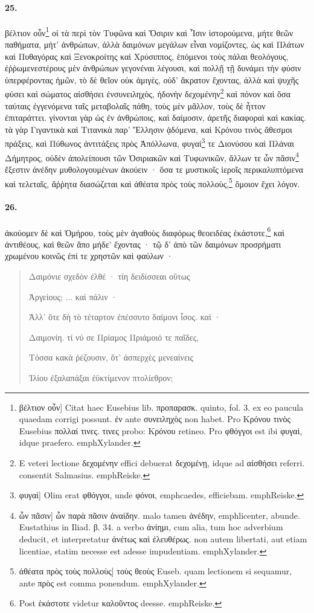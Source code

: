 \documentclass[a4paper, 11pt, oneside, polutonikogreek, german]{article}
\begin{document}
\paragraph{25.}
βέλτιον οὖν\footnote{βέλτιον οὖν] Citat haec Eusebius lib. προπαρασκ. quinto, fol. 3. ex eo paucula quaedam corrigi possunt. ἐν ante συνειληχὸς non habet. Pro Κρόνου τινὸς Eusebius πολλαί τινες. τινες probo: Κρόνου retineo. Pro φθόγγοι est ibi φυγαὶ, idque praefero. emph{Xylander.}} οἱ τὰ περὶ τὸν Τυφῶνα καὶ Ὄσιριν καὶ Ἶσιν ἱστορούμενα, μήτε θεῶν παθήματα, μήτ' ἀνθρώπων, ἀλλὰ δαιμόνων μεγάλων εἶναι νομίζοντες, ὡς καὶ Πλάτων καὶ Πυθαγόρας καὶ Ξενοκροίτης καὶ Χρύσιππος, ἑπόμενοι τοὺς πάλαι θεολόγους, ἐῤῥωμενεστέρους μὲν ἀνθρώπων γεγονέναι λέγουσι, καὶ πολλῇ τῇ δυνάμει τὴν φύσιν ὑπερφέροντας ἡμῶν, τὸ δὲ θεῖον οὐκ ἀμιγὲς, οὐδ' ἄκρατον ἔχοντας, ἀλλὰ καὶ ψυχῆς φύσει καὶ σώματος αἰσθήσει ἐνσυνειληχὸς, ἡδονὴν δεχομένην\footnote{E veteri lectione δεχομένην effici debuerat δεχομένῃ, idque ad αἰσθήσει referri. consentit Salmasius. emph{Reiske.}} καὶ πόνον καὶ ὅσα ταύταις ἐγγενόμενα ταῖς μεταβολαῖς πάθη, τοὺς μὲν μᾶλλον, τοὺς δὲ ἧττον ἐπιταράττει. γίνονται γὰρ ὡς ἐν ἀνθρώποις, καὶ δαίμοσιν, ἀρετῆς διαφοραὶ καὶ κακίας. τὰ γὰρ Γιγαντικὰ καὶ Τιτανικὰ παρ' Ἕλλησιν ᾀδόμενα, καὶ Κρόνου τινὸς ἄθεσμοι πράξεις, καὶ Πύθωνος ἀντιτάξεις πρὸς Ἀπόλλωνα, φυγαί\footnote{φυγαὶ] Olim erat φθόγγοι, unde φόνοι, emph{caedes}, efficiebam. emph{Reiske.}} τε Διονύσου καὶ Πλάναι Δήμητρος, οὐδὲν ἀπολείπουσι τῶν Ὀσιριακῶν καὶ Τυφωνικῶν, ἄλλων τε ὧν πᾶσιν\footnote{ὧν πᾶσιν] ὧν παρὰ πᾶσιν ἀναίδην. malo tamen ἀνέδην, emph{licenter, abunde}. Eustathius in Iliad. β. 34. a verbo ἀνίημι, cum alia, tum hoc adverbium deducit, et interpretatur ἀνέτως καὶ ἐλευθέρως. non autem libertati, aut etiam licentiae, statim necesse est adesse impudentiam. emph{Xylander.}} ἔξεστιν ἀνέδην μυθολογουμένων ἀκούειν · ὅσα τε μυστικοῖς ἱεροῖς περικαλυπτόμενα καὶ τελεταῖς, ἄῤῥητα διασώζεται καὶ ἀθέατα πρὸς τοὺς πολλοὺς,\footnote{ἀθέατα πρὸς τοὺς πολλοὺς] τοὺς θεοὺς Euseb. quam lectionem si sequamur, ante πρὸς est comma ponendum. emph{Xylander.}} ὅμοιον ἔχει λόγον.

\paragraph{26.}
ἀκούομεν δὲ καὶ Ὁμήρου, τοὺς μὲν ἀγαθοὺς διαφόρως θεοειδέας ἑκάστοτε,\footnote{Post ἑκάστοτε videtur καλοῦντος deesse. emph{Reiske.}} καὶ ἀντιθέους, καὶ θεῶν ἄπο μήδε' ἔχοντας · τῷ δ' ἀπὸ τῶν δαιμόνων προσρήματι χρωμένου κοινῶς ἐπί τε χρηστῶν καὶ φαύλων ·
\begin{quotation}
Δαιμόνιε σχεδὸν ἐλθέ · τίη δειδίσσεαι οὕτως

Ἀργείους; ... καὶ πάλιν ·

Ἀλλ' ὅτε δὴ τὸ τέταρτον ἐπέσσυτο δαίμονι ἶσος. καὶ ·

Δαιμονίη. τί νύ σε Πρίαμος Πριάμοιό τε παῖδες,

Τόσσα κακὰ ῥέζουσιν, ὅτ' ἀσπερχὲς μενεαίνεις

Ἰλίου ἐξαλαπάξαι ἐϋκτίμενον πτολίεθρον;
\end{quotation}
\end{document}
